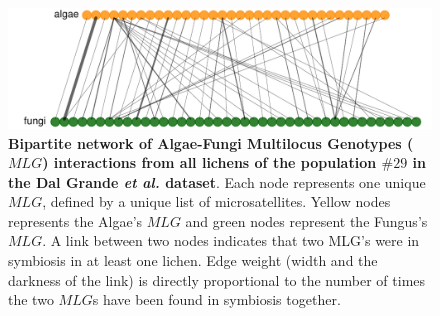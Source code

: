 \documentclass[fleqn,10pt]{wlscirep}
\begin{document}
\begin{figure}
\centering
 \includegraphics[width=.9\textwidth]{img/bipartite29.pdf}
 
\caption{\textbf{Bipartite network of Algae-Fungi Multilocus Genotypes ($MLG$) interactions from all lichens of the population $\#29$ in the Dal Grande \textbf{}\emph{et al.} dataset\cite{dal2012vertical}}. Each node represents one unique $MLG$, defined by a unique list of microsatellites. Yellow nodes represents the Algae's $MLG$ and green nodes represent the Fungus's $MLG$. A link between two nodes indicates that two MLG's were in symbiosis in at least one lichen. Edge weight (width and the darkness of the link) is directly proportional to the number of times the two $MLG$s have been found in symbiosis together.}
\label{fig:bipartite_ex}

\end{figure}
\end{document}
